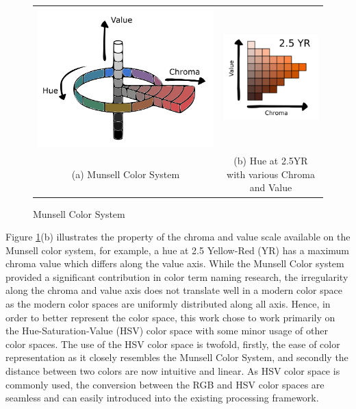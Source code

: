 \begin{figure}[htb!]
  \centering
\begin{tabular}{cc}
 \includegraphics[width=0.4\linewidth]{image/general/munsell.png}  &
 \includegraphics[width=0.4\linewidth]{image/general/25YR.png}\\
 (a) Munsell Color System &
(b) Hue at 2.5YR with various Chroma and Value\\
\end{tabular}
\caption{Munsell Color System} \label{fig:munsell}
\end{figure}


Figure \ref{fig:munsell}(b) illustrates the property of the chroma and value scale available on the Munsell color system, for example, a hue at 2.5 Yellow-Red (YR) has a maximum chroma value which differs along the value axis. While the Munsell Color system provided a significant contribution in color term naming research, the irregularity along the chroma and value axis does not translate well in a modern color space as the modern color spaces are uniformly distributed along all axis. Hence, in order to better represent the color space, this work chose to work primarily on the Hue-Saturation-Value (HSV) color space with some minor usage of other color spaces. The use of the HSV color space is twofold, firstly, the ease of color representation as it closely resembles the Munsell Color System, and secondly the distance between two colors are now intuitive and linear. As HSV color space is commonly used, the conversion between the RGB and HSV color spaces are seamless and can easily introduced into the existing processing framework. 

